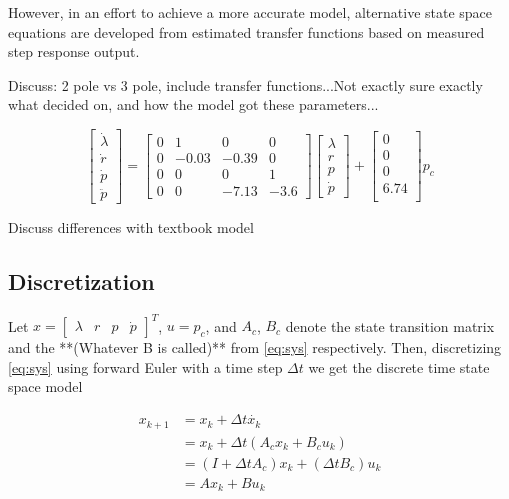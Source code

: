 However, in an effort to achieve a more accurate model, alternative state space equations are developed from estimated transfer functions based on measured step response output.

Discuss: 2 pole vs 3 pole, include transfer functions...Not exactly sure exactly what decided on, and how the model got these parameters...

\begin{equation}
	\begin{bmatrix}
		\dot{\lambda}\\
		\dot{r}\\
		\dot{p}\\
		\ddot{p}
	\end{bmatrix} = 
	\begin{bmatrix}
		0 & 1 & 0 & 0 \\
		0 & -0.03 & -0.39 & 0 \\
		0 & 0 & 0 & 1 \\
		0 & 0 & -7.13 & -3.6
	\end{bmatrix}
	\begin{bmatrix}
		\lambda	\\
		r		\\
		p		\\
		\dot{p}
	\end{bmatrix} +
	\begin{bmatrix}
		0 \\
		0 \\
		0 \\
		6.74 \\
	\end{bmatrix}
	p_c
	\label{eq:sys}
\end{equation}

Discuss differences with textbook model

\subsection{Discretization}
Let $x = \begin{bmatrix}\lambda&r&p&\dot{p}\end{bmatrix}^T$, $u = p_c$, and $A_c$, $B_c$ denote the state transition matrix and the **(Whatever B is called)** from \eqref{eq:sys} respectively. Then, discretizing \eqref{eq:sys} using forward Euler with a time step $\Delta t$ we get the discrete time state space model

\begin{subequations}
\label{eq:dmodel}
\begin{align}
	x_{k+1} &= x_k + \Delta t \dot{x_k} \\
			&= x_k + \Delta t (A_c x_k + B_c u_k)\\
			&= (I + \Delta t A_c) x_k + (\Delta t B_c) u_k \\
			&= A x_k + B u_k
\end{align}
\end{subequations}

